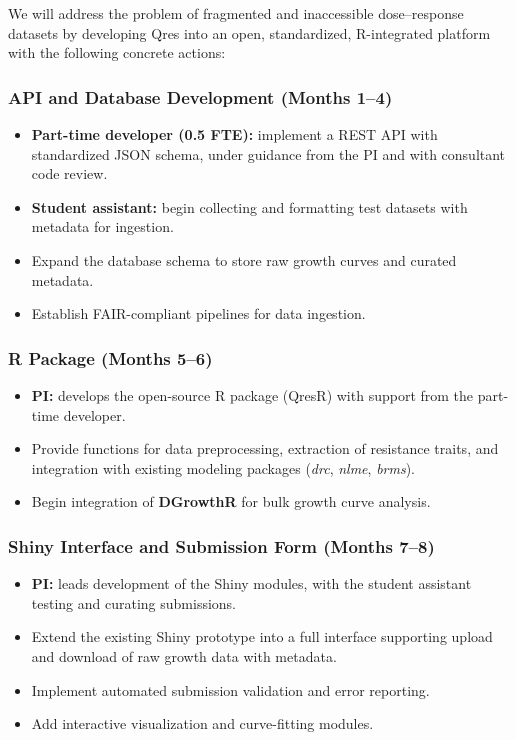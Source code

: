 \documentclass[
]{article}
\providecommand{\tightlist}{%
  \setlength{\itemsep}{0pt}\setlength{\parskip}{0pt}}
\begin{document}
We will address the problem of fragmented and inaccessible
dose--response datasets by developing Qres into an open, standardized,
R-integrated platform with the following concrete actions:

\subsubsection{API and Database Development (Months
1--4)}\label{api-and-database-development-months-14}

\begin{itemize}
\tightlist
\item
  \textbf{Part-time developer (0.5 FTE):} implement a REST API with
  standardized JSON schema, under guidance from the PI and with
  consultant code review.
\item
  \textbf{Student assistant:} begin collecting and formatting test
  datasets with metadata for ingestion.
\item
  Expand the database schema to store raw growth curves and curated
  metadata.
\item
  Establish FAIR-compliant pipelines for data ingestion.
\end{itemize}

\subsubsection{R Package (Months 5--6)}\label{r-package-months-56}

\begin{itemize}
\tightlist
\item
  \textbf{PI:} develops the open-source R package (QresR) with support
  from the part-time developer.
\item
  Provide functions for data preprocessing, extraction of resistance
  traits, and integration with existing modeling packages (\emph{drc},
  \emph{nlme}, \emph{brms}).
\item
  Begin integration of \textbf{DGrowthR} for bulk growth curve analysis.
\end{itemize}

\subsubsection{Shiny Interface and Submission Form (Months
7--8)}\label{shiny-interface-and-submission-form-months-78}

\begin{itemize}
\tightlist
\item
  \textbf{PI:} leads development of the Shiny modules, with the student
  assistant testing and curating submissions.
\item
  Extend the existing Shiny prototype into a full interface supporting
  upload and download of raw growth data with metadata.
\item
  Implement automated submission validation and error reporting.
\item
  Add interactive visualization and curve-fitting modules.
\end{itemize}
\end{document}
